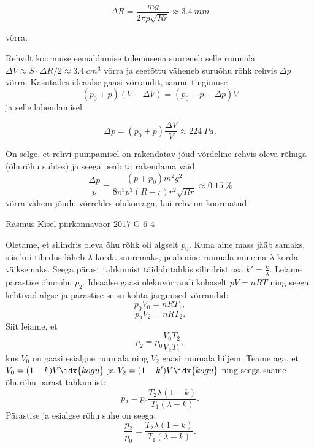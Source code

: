 \documentclass[11pt, twoside]{article}
\begin{document}
{{\begin{equation}
\Delta R=\frac{mg}{2\pi p\sqrt{Rr}}\approx\SI{3.4}{mm}
\end{equation}

\noindent võrra.

Rehvilt koormuse eemaldamise tulemusena suureneb selle ruumala $\Delta V\approx S\cdot\Delta R/2\approx\SI{3.4}{cm^{3}}$ võrra ja seetõttu väheneb suruõhu rõhk rehvis $\Delta p$ võrra. Kasutades ideaalse gaasi võrrandit, saame tingimuse
\[
\left(p_{0}+p\right)\left(V-\Delta V\right)=\left(p_{0}+p-\Delta p\right)V
\]
ja selle lahendamisel

\begin{equation}
\Delta p=\left(p_{0}+p\right)\frac{\Delta V}{V}\approx\SI{224}{Pa}.
\end{equation}

On selge, et rehvi pumpamisel on rakendatav jõud võrdeline rehvis oleva rõhuga (õhurõhu suhtes) ja seega peab ta rakendama vaid 
\[
\frac{\Delta p}{p}=\frac{\left(p+p_{0}\right)m^{2}g^{2}}{8\pi^{3}p^{3}\left(R-r\right)r^{2}\sqrt{Rr}}\approx\SI{0.15}{\percent}
\]
võrra vähem jõudu võrreldes olukorraga, kui rehv on koormatud.
\fi
}

{Rasmus Kisel} %
{piirkonnavoor} %
{2017} %
{G 6} %
{4} %
{

\ifSolution
Oletame, et silindris oleva õhu rõhk oli algselt $p_{0}$. Kuna aine mass jääb samaks, siis kui tihedus läheb $\lambda$ korda suuremaks, peab aine ruumala minema $\lambda$ korda väiksemaks. Seega pärast tahkumist täidab tahkis silindrist osa $k'=\frac{k}{\lambda}$. Leiame pärastise õhurõhu $p_{2}$. Ideaalse gaasi olekuvõrrandi kohaselt $pV=nRT$ ning seega kehtivad algse ja pärastise seisu kohta järgmised võrrandid:
\begin{equation*}
p_{0}V_{0}=nRT_{1},
\end{equation*}
\begin{equation*}
p_{2}V_{2}=nRT_{2}.
\end{equation*}
Siit leiame, et
\[
p_{2}=p_{0}\frac{V_{0}T_{2}}{V_{2}T_{1}},
\]
kus $V_{0}$ on gaasi esialgne ruumala ning $V_{2}$ gaasi ruumala hiljem. Teame aga, et $V_{0}=(1-k)V\idx{kogu}$ ja $V_{2}=(1-k')V\idx{kogu}$ ning seega saame õhurõhu pärast tahkumist:
\begin{equation*}
p_{2}=p_{0}\frac{T_{2}\lambda (1-k)}{T_{1}(\lambda-k)}.
\end{equation*}
Pärastise ja esialgse rõhu suhe on seega:
\begin{equation*}
\frac{p_{2}}{p_{0}}=\frac{T_{2}\lambda(1-k)}{T_{1}(\lambda-k)}.
\end{equation*}
\fi
}

}
\end{document}
